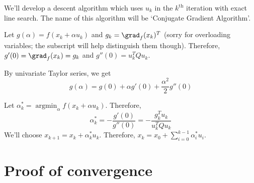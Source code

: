 We'll develop a descent algorithm which uses $u_k$ in the $k^{\textrm{th}}$ iteration
with exact line search. The name of this algorithm will be `Conjugate Gradient Algorithm'.

Let $g(\alpha) = f(x_k + \alpha u_k)$ and $g_k = \grad_f(x_k)^T$
(sorry for overloading variables; the subscript will help distinguish them though).
Therefore, $g'(0) = \grad_f(x_k) = g_k$ and $g''(0) = u_k^TQu_k$.

By univariate Taylor series, we get
\[ g(\alpha) = g(0) + \alpha g'(0) + \frac{\alpha^2}{2} g''(0) \]

Let $\alpha_k^* = \operatorname{argmin}_{\alpha} f(x_k + \alpha u_k)$.
Therefore, \[ \alpha_k^* = - \frac{g'(0)}{g''(0)} = - \frac{g_k^Tu_k}{u_k^TQu_k} \]
We'll choose $x_{k+1} = x_k + \alpha_k^*u_k$.
Therefore, $x_k = x_0 + \sum_{i=0}^{k-1} \alpha_i^* u_i$.

\section{Proof of convergence}

